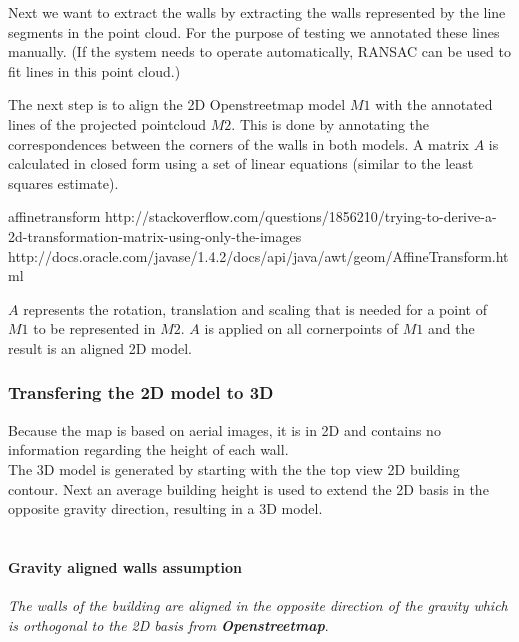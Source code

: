 Next we want to extract the walls by extracting the walls represented by the
line segments in the point cloud.  For the purpose of testing we annotated these
lines manually.  (If the system needs to operate automatically, RANSAC can be
used to fit lines in this point cloud.)

The next step is to align the 2D Openstreetmap model $M1$ with the annotated
lines of the projected pointcloud $M2$. This is done by annotating the
correspondences between the corners of the walls in both models.  A matrix $A$ is
calculated in closed form using a set of linear equations %
\cite{} 
(similar to the least squares estimate).

affinetransform
http://stackoverflow.com/questions/1856210/trying-to-derive-a-2d-transformation-matrix-using-only-the-images
http://docs.oracle.com/javase/1.4.2/docs/api/java/awt/geom/AffineTransform.html


$A$ represents the rotation, translation and scaling that is needed for a
point of $M1$ to be represented in $M2$.
$A$ is applied on all cornerpoints of $M1$ and the result is an aligned 2D
model.







\subsubsection{Transfering the 2D model to 3D}
Because the map is based on aerial images, it is in 2D and contains no
information regarding the height of each wall.  
\\

The 3D model is generated by starting with the the top view 2D building contour.
Next an average building height is used to extend the 2D basis in the opposite gravity direction,
resulting in a 3D model.\\\\
\paragraph{Gravity aligned walls assumption}
	\emph{The walls of the building are aligned in the opposite direction of the gravity
	which is orthogonal to the 2D basis from \textbf{Openstreetmap}}.\\

